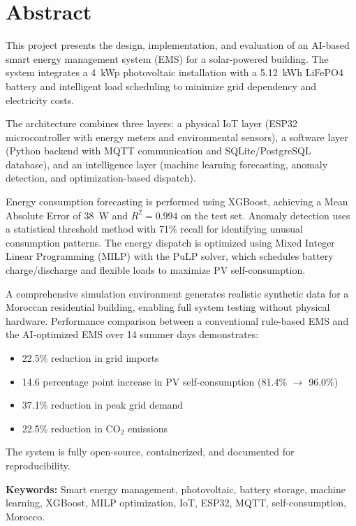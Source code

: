 \chapter*{Abstract}

This project presents the design, implementation, and evaluation of an AI-based smart energy management system (EMS) for a solar-powered building. The system integrates a 4~kWp photovoltaic installation with a 5.12~kWh LiFePO4 battery and intelligent load scheduling to minimize grid dependency and electricity costs.

The architecture combines three layers: a physical IoT layer (ESP32 microcontroller with energy meters and environmental sensors), a software layer (Python backend with MQTT communication and SQLite/PostgreSQL database), and an intelligence layer (machine learning forecasting, anomaly detection, and optimization-based dispatch).

Energy consumption forecasting is performed using XGBoost, achieving a Mean Absolute Error of 38~W and $R^2 = 0.994$ on the test set. Anomaly detection uses a statistical threshold method with 71\% recall for identifying unusual consumption patterns. The energy dispatch is optimized using Mixed Integer Linear Programming (MILP) with the PuLP solver, which schedules battery charge/discharge and flexible loads to maximize PV self-consumption.

A comprehensive simulation environment generates realistic synthetic data for a Moroccan residential building, enabling full system testing without physical hardware. Performance comparison between a conventional rule-based EMS and the AI-optimized EMS over 14 summer days demonstrates:

\begin{itemize}[nosep]
    \item 22.5\% reduction in grid imports
    \item 14.6 percentage point increase in PV self-consumption (81.4\% $\to$ 96.0\%)
    \item 37.1\% reduction in peak grid demand
    \item 22.5\% reduction in CO$_2$ emissions
\end{itemize}

The system is fully open-source, containerized, and documented for reproducibility.

\vspace{0.5cm}
\noindent\textbf{Keywords:} Smart energy management, photovoltaic, battery storage, machine learning, XGBoost, MILP optimization, IoT, ESP32, MQTT, self-consumption, Morocco.

